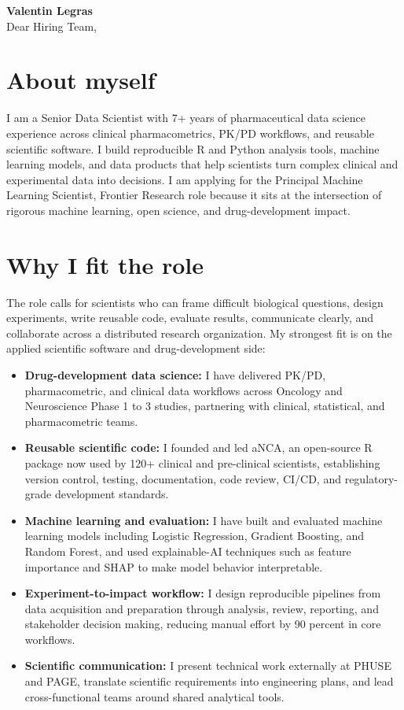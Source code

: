 \documentclass[11pt,a4paper]{article}
\newcommand{\Position}{Principal Machine Learning Scientist, Frontier Research}
\begin{document}
{\Large\bfseries\color{accent} Valentin Legras}\\[8pt]

Dear Hiring Team,

\section{About myself}
I am a Senior Data Scientist with 7+ years of pharmaceutical data science
experience across clinical pharmacometrics, PK/PD workflows, and reusable
scientific software. I build reproducible R and Python analysis tools, machine
learning models, and data products that help scientists turn complex clinical
and experimental data into decisions. I am applying for the \Position{} role
because it sits at the intersection of rigorous machine learning, open science,
and drug-development impact.

\section{Why I fit the role}
The role calls for scientists who can frame difficult biological questions,
design experiments, write reusable code, evaluate results, communicate clearly,
and collaborate across a distributed research organization. My strongest fit is
on the applied scientific software and drug-development side:

\begin{itemize}
  \item \textbf{Drug-development data science:} I have delivered PK/PD,
        pharmacometric, and clinical data workflows across Oncology and
        Neuroscience Phase 1 to 3 studies, partnering with clinical,
        statistical, and pharmacometric teams.
  \item \textbf{Reusable scientific code:} I founded and led aNCA, an
        open-source R package now used by 120+ clinical and pre-clinical
        scientists, establishing version control, testing, documentation, code
        review, CI/CD, and regulatory-grade development standards.
  \item \textbf{Machine learning and evaluation:} I have built and evaluated
        machine learning models including Logistic Regression, Gradient
        Boosting, and Random Forest, and used explainable-AI techniques such as
        feature importance and SHAP to make model behavior interpretable.
  \item \textbf{Experiment-to-impact workflow:} I design reproducible pipelines
        from data acquisition and preparation through analysis, review,
        reporting, and stakeholder decision making, reducing manual effort by
        90 percent in core workflows.
  \item \textbf{Scientific communication:} I present technical work externally
        at PHUSE and PAGE, translate scientific requirements into engineering
        plans, and lead cross-functional teams around shared analytical tools.
\end{itemize}
\end{document}
